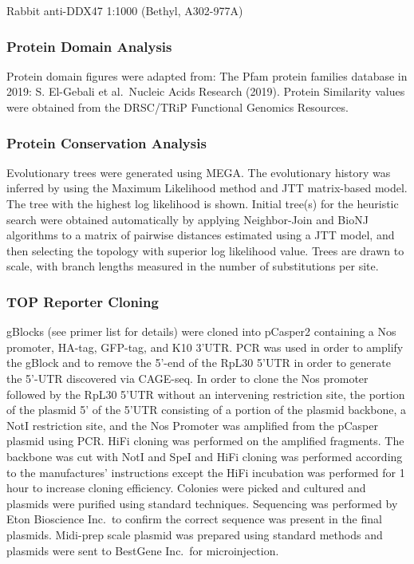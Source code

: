 \documentclass[12pt,oneside]{reedthesis}
\begin{document}
Rabbit anti-DDX47 1:1000 (Bethyl, A302-977A)

\hypertarget{protein-domain-analysis}{%
\subsubsection{Protein Domain Analysis}\label{protein-domain-analysis}}

Protein domain figures were adapted from: The Pfam protein families database in 2019: S. El-Gebali et al.~Nucleic Acids Research (2019). Protein Similarity values were obtained from the DRSC/TRiP Functional Genomics Resources.

\hypertarget{protein-conservation-analysis}{%
\subsubsection{Protein Conservation Analysis}\label{protein-conservation-analysis}}

Evolutionary trees were generated using MEGA. The evolutionary history was inferred by using the Maximum Likelihood method and JTT matrix-based model. The tree with the highest log likelihood is shown. Initial tree(s) for the heuristic search were obtained automatically by applying Neighbor-Join and BioNJ algorithms to a matrix of pairwise distances estimated using a JTT model, and then selecting the topology with superior log likelihood value. Trees are drawn to scale, with branch lengths measured in the number of substitutions per site.

\hypertarget{top-reporter-cloning}{%
\subsubsection{TOP Reporter Cloning}\label{top-reporter-cloning}}

gBlocks (see primer list for details) were cloned into pCasper2 containing a Nos promoter, HA-tag, GFP-tag, and K10 3'UTR. PCR was used in order to amplify the gBlock and to remove the 5'-end of the RpL30 5'UTR in order to generate the 5'-UTR discovered via CAGE-seq. In order to clone the Nos promoter followed by the RpL30 5'UTR without an intervening restriction site, the portion of the plasmid 5' of the 5'UTR consisting of a portion of the plasmid backbone, a NotI restriction site, and the Nos Promoter was amplified from the pCasper plasmid using PCR. HiFi cloning was performed on the amplified fragments. The backbone was cut with NotI and SpeI and HiFi cloning was performed according to the manufactures' instructions except the HiFi incubation was performed for 1 hour to increase cloning efficiency. Colonies were picked and cultured and plasmids were purified using standard techniques. Sequencing was performed by Eton Bioscience Inc.~to confirm the correct sequence was present in the final plasmids. Midi-prep scale plasmid was prepared using standard methods and plasmids were sent to BestGene Inc.~for microinjection.
\end{document}
